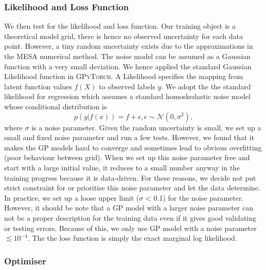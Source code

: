 \subsubsection{Likelihood and Loss Function}

We then test for the likelihood and loss function. Our training object is a theoretical model grid, there is hence no observed uncertainty for each data point. However, a tiny random uncertainty exists due to the approximations in the \textsc{MESA} numerical method. The noise model can be assumed as a Gaussian function with a very small deviation. We hence applied the standard Gaussian Likelihood function in \textsc{GPyTorch}. 
%   
A Likelihood  specifies the mapping from latent function values $f(X)$ to observed labels $y$.
We adopt the the standard likelihood for regression which assumes a standard homoskedastic noise model whose conditional distribution is
\begin{equation}\label{eq:likelihood}
p(y|f(x)) = f + \epsilon, \epsilon \sim \mathcal{N}(0, \sigma^{2}),
\end{equation}
where $\sigma$ is a noise parameter. 
%
Given the random uncertainty is small, we set up a small and fixed noise parameter and run a few tests. However, we found that it makes the GP models hard to converge and sometimes lead to obvious overfitting (poor behaviour between grid). When we set up this noise parameter free and start with a large initial value, it reduces to a small number anyway in the training progress because it is data-driven. For these reasons, we decide not put strict constraint for or prioritise this noise parameter and let the data determine. In practice, we set up a loose upper limit ($\sigma$  < 0.1) for the noise parameter. However, it should be note that a GP model with a larger noise parameter can not be a proper description for the training data even if it gives good validating or testing errors. Because of this, we only use GP model with a noise parameter $\lesssim 10^{-4}$.   
The the loss function is simply the exact marginal log likelihood.

\subsubsection{Optimiser}

